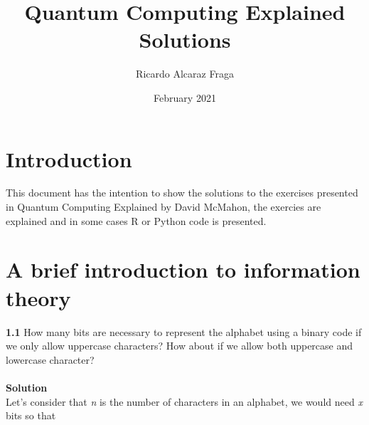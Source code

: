 \documentclass{article}
\title{Quantum Computing Explained Solutions}
\author{Ricardo Alcaraz Fraga}
\date{February 2021}
\begin{document}
\begin{titlepage}
\maketitle
\end{titlepage}

\tableofcontents
\clearpage

\section{Introduction}
This document has the intention to show the solutions to the exercises presented in Quantum Computing Explained by David McMahon, the exercies are explained and in some cases R or Python code is presented.

\section{A brief introduction to information theory}
\textbf{1.1} How many bits are necessary to represent the alphabet using a binary code if we only allow uppercase characters? How about if we allow both uppercase and lowercase character?\\ \\
\textbf{Solution}\\
Let's consider that \textit{n} is the number of characters in an alphabet, we would need \textit{x} bits so that \\ 
\end{document}
